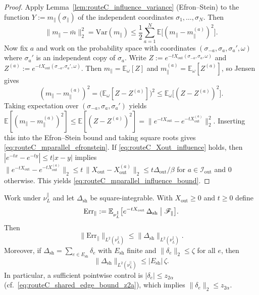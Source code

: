 \begin{proof}
Apply Lemma~\ref{lem:routeC_influence_variance} (Efron--Stein) to the function $Y:=m_\parallel(\sigma_{\parallel})$ of the independent coordinates $\sigma_1,\dots,\sigma_N$.
Then
\[
\|m_\parallel-\bar m\|_2^2=\mathrm{Var}(m_\parallel)
\le \frac12\sum_{a=1}^N\mathbb E\bigl[(m_\parallel-m_\parallel^{(a)})^2\bigr].
\]
Now fix $a$ and work on the probability space with coordinates $(\sigma_{-a},\sigma_a,\sigma_a',\omega)$ where $\sigma_a'$ is an independent copy of $\sigma_a$.
Write $Z:=e^{-tX_{\mathrm{out}}(\sigma_{-a},\sigma_a,\omega)}$ and
$Z^{(a)}:=e^{-tX_{\mathrm{out}}(\sigma_{-a},\sigma_a',\omega)}$.
Then $m_\parallel=\mathbb E_\omega[Z]$ and $m_\parallel^{(a)}=\mathbb E_\omega[Z^{(a)}]$, so Jensen gives
\[
(m_\parallel-m_\parallel^{(a)})^2
=\bigl(\mathbb E_\omega[Z-Z^{(a)}]\bigr)^2
\le \mathbb E_\omega\bigl[(Z-Z^{(a)})^2\bigr].
\]
Taking expectation over $(\sigma_{-a},\sigma_a,\sigma_a')$ yields
$\mathbb E[(m_\parallel-m_\parallel^{(a)})^2]\le \mathbb E[(Z-Z^{(a)})^2]=\|e^{-tX_{\mathrm{out}}}-e^{-tX_{\mathrm{out}}^{(a)}}\|_2^2$.
Inserting this into the Efron--Stein bound and taking square roots gives \eqref{eq:routeC_mparallel_efronstein}.
If \eqref{eq:routeC_Xout_influence} holds, then $|e^{-tx}-e^{-ty}|\le t|x-y|$ implies
$\|e^{-tX_{\mathrm{out}}}-e^{-tX_{\mathrm{out}}^{(a)}}\|_2\le t\,\|X_{\mathrm{out}}-X_{\mathrm{out}}^{(a)}\|_2\le t\Delta_{\mathrm{out}}/\beta$ for $a\in\mathcal I_{\mathrm{out}}$ and $0$ otherwise.
This yields \eqref{eq:routeC_mparallel_influence_bound}.
\end{proof}


\begin{lemma}
\label{lem:routeC_errparallel_bound}
Work under $\nu_L^{\parallel}$ and let $\Delta_{\mathrm{sh}}$ be square-integrable.
With $X_{\mathrm{out}}\ge 0$ and $t\ge 0$ define
\[
\mathrm{Err}_\parallel
:=\mathbb E_{\nu_L^{\parallel}}\bigl[e^{-tX_{\mathrm{out}}}\,\Delta_{\mathrm{sh}}\bigm|\mathscr F_\parallel\bigr].
\]
Then
\begin{equation}\label{eq:routeC_errparallel_condexp_contraction}
\|\mathrm{Err}_\parallel\|_{L^2(\nu_L^{\parallel})}
\le \|\Delta_{\mathrm{sh}}\|_{L^2(\nu_L^{\parallel})}.
\end{equation}
Moreover, if $\Delta_{\mathrm{sh}}=\sum_{e\in E_{\mathrm{sh}}}\delta_e$ with $E_{\mathrm{sh}}$ finite and $\|\delta_e\|_2\le \zeta$ for all $e$, then
\begin{equation}\label{eq:routeC_Delta_sh_counting}
\|\Delta_{\mathrm{sh}}\|_{L^2(\nu_L^{\parallel})}\le |E_{\mathrm{sh}}|\,\zeta.
\end{equation}
In particular, a sufficient pointwise control is $|\delta_e|\le z_{2\alpha}$ (cf.\ \eqref{eq:routeC_shared_edge_bound_z2a}), which implies $\|\delta_e\|_2\le z_{2\alpha}$.
\end{lemma}

